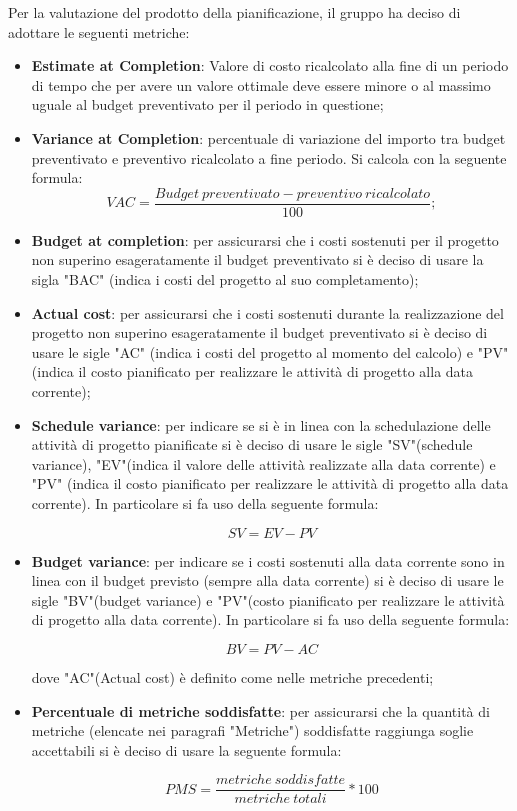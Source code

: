 Per la valutazione del prodotto della pianificazione, il gruppo ha deciso di adottare le seguenti metriche:
\begin{itemize}
\item \textbf{Estimate at Completion}: Valore di costo ricalcolato alla fine di un periodo di tempo che per avere un valore ottimale deve essere minore o al massimo uguale al budget preventivato per il periodo in questione;

\item \textbf{Variance at Completion}: percentuale di variazione del importo tra budget preventivato e preventivo ricalcolato a fine periodo. Si calcola con la seguente formula:
\[ VAC = \frac{Budget \ preventivato - preventivo \ ricalcolato}{100};\]


\item \textbf{Budget at completion}: per assicurarsi che i costi sostenuti per il progetto non superino esageratamente il budget preventivato si è deciso di usare la sigla "BAC" (indica i costi del progetto al suo completamento);
\item \textbf{Actual cost}: per assicurarsi che i costi sostenuti durante la realizzazione del progetto non superino esageratamente il budget preventivato si è deciso di usare le sigle "AC" (indica i costi del progetto al momento del calcolo) e "PV" (indica il costo pianificato per realizzare le attività di progetto alla data corrente);
\item \textbf{Schedule variance}: per indicare se si è in linea con la schedulazione delle attività di progetto pianificate si è deciso di usare le sigle "SV"(schedule variance), "EV"(indica il valore delle attività realizzate alla data corrente) e "PV" (indica il costo pianificato per realizzare le attività di progetto alla data corrente). In particolare si fa uso della seguente formula: \vspace{-0.5cm}
\begin{center}
\[SV=EV-PV\]
\end{center}
\item \textbf{Budget variance}: per indicare se i costi sostenuti alla data corrente sono in linea con il budget previsto (sempre alla data corrente) si è deciso di usare le sigle "BV"(budget variance) e "PV"(costo pianificato per realizzare le attività di progetto alla data corrente).  In particolare si fa uso della seguente formula: \vspace{-0.5cm}
\begin{center}
\[BV=PV-AC\]
\end{center}
dove "AC"(Actual cost) è definito come nelle metriche precedenti;
\item \textbf{Percentuale di metriche soddisfatte}: per assicurarsi che la quantità di metriche (elencate nei paragrafi "Metriche") soddisfatte raggiunga soglie accettabili si è deciso di usare la seguente formula:
\begin{center}
\[PMS=\frac{metriche \ soddisfatte}{metriche \ totali}*100\]
\end{center}
\end{itemize}


